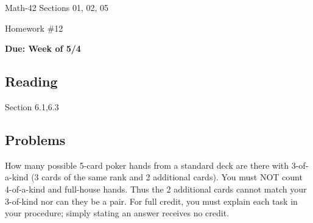 \documentclass[letterpaper,12pt,fleqn]{article}
\begin{document}
\begin{center}
  \large
  Math-42 Sections 01, 02, 05

  \Large
  Homework \#12

  \large
  \textbf{Due: Week of 5/4}
\end{center}

\subsection*{Reading}

Section 6.1,6.3

\subsection*{Problems}

How many possible 5-card poker hands from a standard deck are there with 3-of-a-kind (3 cards of the same rank and
2 additional cards).  You must NOT count 4-of-a-kind and full-house hands.  Thus the 2 additional cards cannot
match your 3-of-kind nor can they be a pair.  For full credit, you must explain each task in your procedure;
simply stating an answer receives no credit.
\end{document}
